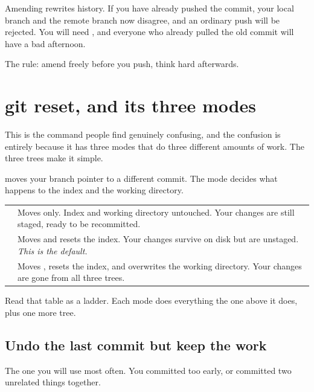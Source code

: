 \documentclass[11pt]{article}
\begin{document}
\begin{trap}
Amending rewrites history. If you have already pushed the commit, your local branch
and the remote branch now disagree, and an ordinary push will be rejected. You will
need , and everyone who already pulled the old
commit will have a bad afternoon.

The rule: amend freely before you push, think hard afterwards.
\end{trap}

\section{git reset, and its three modes}

This is the command people find genuinely confusing, and the confusion is entirely
because it has three modes that do three different amounts of work. The three trees
make it simple.

 moves your branch pointer to a different commit. The mode decides
what happens to the index and the working directory.

\vspace{0.5em}
\begin{tabularx}{\linewidth}{@{}L{2.6cm} X@{}}
\toprule
{} &  \\
\midrule
{} & Moves  only. Index and working directory untouched. Your
changes are still staged, ready to be recommitted. \\
 & Moves  and resets the index. Your changes survive on disk
but are unstaged. \emph{This is the default.} \\
 & Moves , resets the index, and overwrites the working
directory. Your changes are gone from all three trees. \\
\bottomrule
\end{tabularx}
\vspace{0.5em}

Read that table as a ladder. Each mode does everything the one above it does, plus
one more tree.

\subsection{Undo the last commit but keep the work}

The one you will use most often. You committed too early, or committed two unrelated
things together.
\end{document}

